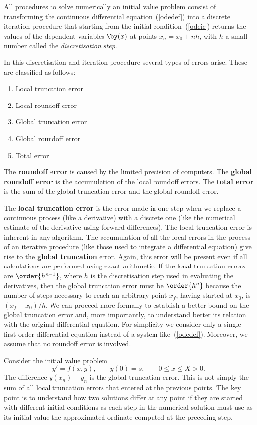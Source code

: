 All procedures to solve numerically an initial value problem consist
of transforming the continuous differential equation~(\ref{odedef})
into a discrete iteration procedure that starting from the initial
condition~(\ref{odeic}) returns the values of the dependent variables
$\by(x)$ at points $x_n = x_0 + n h$, with $h$ a small number called
the \textit{discretisation step}.

In this discretisation and iteration procedure several types of errors
arise.  These are classified as follows:
%
\begin{enumerate}
  \itemsep 0pt
\item Local truncation error
\item Local roundoff error
\item Global truncation error
\item Global roundoff error
\item Total error
\end{enumerate}
%
The \textbf{roundoff error} is caused by the limited precision of
computers.  The \textbf{global roundoff error} is the accumulation of
the local roundoff errors.  The \textbf{total error} is the sum of the
global truncation error and the global roundoff error.

The \textbf{local truncation error} is the error made in one step when
we replace a continuous process (like a derivative) with a discrete
one (like the numerical estimate of the derivative using forward
differences).  The local truncation error is inherent in any
algorithm.  The accumulation of all the local errors in the process of
an iterative procedure (like those used to integrate a differential
equation) give rise to the \textbf{global truncation} error.  Again,
this error will be present even if all calculations are performed
using exact arithmetic.  If the local truncation errors are
$\order{h^{n+1}}$, where $h$ is the discretisation step used in evaluating
the derivatives, then the global truncation error must be $\order{h^n}$
because the number of steps necessary to reach an arbitrary point
$x_f$, having started at $x_0$, is $(x_f-x_0)/h$.  We can proceed more
formally to establish a better bound on the global truncation error
and, more importantly, to understand better its relation with the
original differential equation.  For simplicity we consider only a
single first order differential equation instead of a system
like~(\ref{odedef}).  Moreover, we assume that no roundoff error is
involved.

Consider the initial value problem
%
\begin{equation}
  y'=f(x,y), \qquad y(0)=s, \qquad 0\le x\le X>0.
  \label{IVP.eq:30}
\end{equation}
%
The difference $y(x_n)-y_n$ is the global truncation error. This is
not simply the sum of all local truncation errors that entered at the
previous points. The key point is to understand how two solutions
differ at any point if they are started with different initial
conditions as each step in the numerical solution must use as its
initial value the approximated ordinate computed at the preceding
step.

